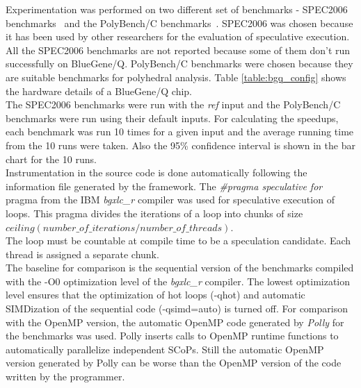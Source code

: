 \documentclass[10pt]{report}          %
\begin{document}
Experimentation was performed on two different set of benchmarks - SPEC2006 benchmarks~\cite{spec}  and the PolyBench/C benchmarks~\cite{polybench}.  SPEC2006 was chosen because it has been used by other researchers for the evaluation of speculative execution. All the SPEC2006 benchmarks are not reported because some of them don't run successfully on BlueGene/Q.  PolyBench/C benchmarks were chosen because they are suitable benchmarks for polyhedral analysis.  Table \ref{table:bgq_config} shows the hardware details of a BlueGene/Q chip. \\
 
The SPEC2006 benchmarks were run with the \textit{ref} input and the PolyBench/C benchmarks were run using their default inputs.  For calculating the speedups, each benchmark was run 10 times for a given input and the average running time from the 10 runs were taken. Also the 95\% confidence interval is shown in the bar chart for the 10 runs.\\

Instrumentation in the source code is done automatically following the information file generated by the framework.  The \textit{\#pragma speculative for} pragma from the IBM \textit{bgxlc\_r} compiler was used for speculative execution of loops.  This pragma divides the iterations of a loop into chunks of size
$ceiling(number\_of\_iterations/number\_of\_threads)$. \\

The loop must be countable at compile time to be a speculation candidate.  Each thread is assigned a separate chunk.\\

The baseline for comparison is the sequential version of the benchmarks compiled with the -O0 optimization level of the \textit{bgxlc\_r} compiler.  The lowest optimization level ensures that the optimization of hot loops (-qhot) and automatic SIMDization of the sequential code (-qsimd=auto) is turned off. For comparison with the OpenMP version, the automatic OpenMP code generated by \textit{Polly} for the benchmarks was used.  Polly inserts calls to OpenMP runtime functions to automatically parallelize independent SCoPs. Still the automatic OpenMP version generated by Polly can be worse than the OpenMP version of the code written by the programmer.
\end{document}
